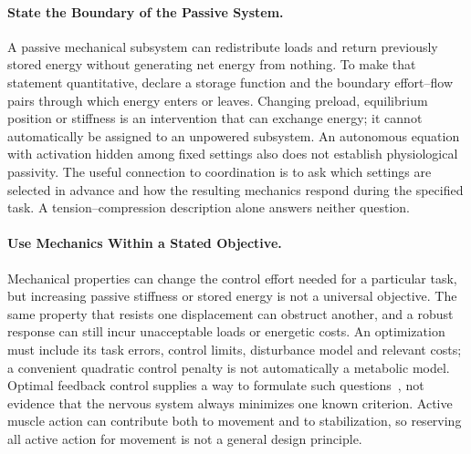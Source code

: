 
\paragraph{State the Boundary of the Passive System.}
A passive mechanical subsystem can redistribute loads and return previously stored energy without generating net energy from nothing.
To make that statement quantitative, declare a storage function and the boundary effort--flow pairs through which energy enters or leaves.
Changing preload, equilibrium position or stiffness is an intervention that can exchange energy; it cannot automatically be assigned to an unpowered subsystem.
An autonomous equation with activation hidden among fixed settings also does not establish physiological passivity.
The useful connection to coordination is to ask which settings are selected in advance and how the resulting mechanics respond during the specified task.
A tension--compression description alone answers neither question.


\paragraph{Use Mechanics Within a Stated Objective.}
Mechanical properties can change the control effort needed for a particular task, but increasing passive stiffness or stored energy is not a universal objective.
The same property that resists one displacement can obstruct another, and a robust response can still incur unacceptable loads or energetic costs.
An optimization must include its task errors, control limits, disturbance model and relevant costs; a convenient quadratic control penalty is not automatically a metabolic model.
Optimal feedback control supplies a way to formulate such questions~\cite{Todorov2002}, not evidence that the nervous system always minimizes one known criterion.
Active muscle action can contribute both to movement and to stabilization, so reserving all active action for movement is not a general design principle.



